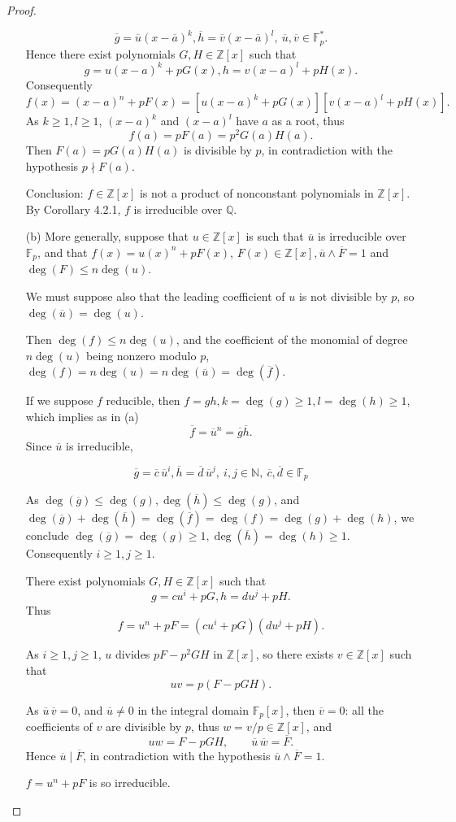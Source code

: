 \documentclass[11pt,a4paper]{article}
\newcommand{\F}{\mathbb{F}}
\begin{document}
\begin{proof}
\begin{enumerate}
$$\overline{g} = \overline{u}( x-\overline{a})^k, \overline{h} = \overline{v}( x-\overline{a})^l, \ \overline{u},\overline{v} \in \mathbb{F}_p^*.$$
Hence there exist polynomials $G,H \in \mathbb{Z}[x]$ such that
 $$g = u(x-a)^k + p G(x), h =v(x-a)^l + pH(x).$$
Consequently
 $$f(x) = (x-a)^n + pF(x) = [u(x-a)^k + p G(x)][v(x-a)^l + pH(x)].$$
As $k\geq 1, l \geq 1$, $(x-a)^k$ and $(x-a)^l$ have $a$ as a root, thus
 $$f(a) = pF(a) = p^2 G(a) H(a).$$
Then $F(a) = p G(a)H(a)$ is divisible by $p$, in contradiction with the hypothesis $p\nmid F(a)$.
 
 Conclusion: $f\in \mathbb{Z}[x]$ is not a product of nonconstant polynomials  in $\mathbb{Z}[x]$. By Corollary 4.2.1, $f$ is irreducible over $\mathbb{Q}$.
 

 \item[(b)]
More generally, suppose that $u \in \mathbb{Z}[x]$ is such that $\overline{u}$ is irreducible over $\F_p$, and that $f(x) = u(x)^n + pF(x)$, $F(x) \in \mathbb{Z}[x], \overline{u}\wedge \overline{F} =1$ and $\deg(F) \leq n \deg(u)$.

We must suppose also that the leading coefficient of $u$ is not divisible by $p$, so $\deg(\overline{u}) = \deg(u) $.

Then $\deg(f) \leq n \deg(u)$, and the coefficient of the monomial of degree $n \deg(u)$ being nonzero modulo $p$, $\deg(f) = n \deg(u)=n\deg(\overline{u}) =  \deg(\overline{f})$.

If we suppose $f$ reducible, then  $f = gh, k = \deg(g)\geq 1, l = \deg(h) \geq 1$, which implies as in (a) 
$$\overline{f} = \overline{u}^n = \overline{g}\overline{h}.$$
Since $\overline{u}$ is irreducible,
 
 $$\overline{g} = \overline{c} \, \overline{u}^i, \overline{h} =\overline{d} \,  \overline{u}^j,\  i,j \in \mathbb{N}, \ \overline{c}, \overline{d} \in \F_p$$
 
As $\deg(\overline{g}) \leq \deg(g), \deg(\overline{h}) \leq \deg(g)$, and $\deg(\overline{g}) + \deg(\overline{h}) = \deg(\overline{f}) = \deg(f) = \deg(g) + \deg(h)$, we conclude $\deg(\overline{g})  = \deg(g)\geq 1, \deg(\overline{h})= \deg(h)\geq 1$.  Consequently $i\geq 1, j \geq 1$.

There exist polynomials $G,H \in \mathbb{Z}[x]$ such that
$$g= cu^i + p G, h = du^j+pH.$$
Thus
$$f = u^n +pF = (cu^i+pG)(du^j+pH).$$

As $i\geq 1, j\geq 1$, $u$ divides $pF - p^2 GH$ in $\mathbb{Z}[x]$, so there exists $v \in \mathbb{Z}[x]$ such that 
$$uv = p(F - pGH).$$

As $\overline{u}\, \overline{v} = 0$, and $ \overline{u} \neq 0$ in the integral domain $\F_p[x]$, then $\overline{v} = 0$: all the coefficients of $v$ are divisible by $p$, thus $w= v/p \in \mathbb{Z}[x]$, and
$$uw = F-pGH,\qquad  \overline{u}\, \overline{w} = \overline{F}.$$
Hence $\overline{u} \mid \overline{F}$, in contradiction with the hypothesis $\overline{u} \wedge \overline{F} = 1$.

$f = u^n +pF$ is so irreducible.
\end{enumerate}
\end{proof}
\end{document}
